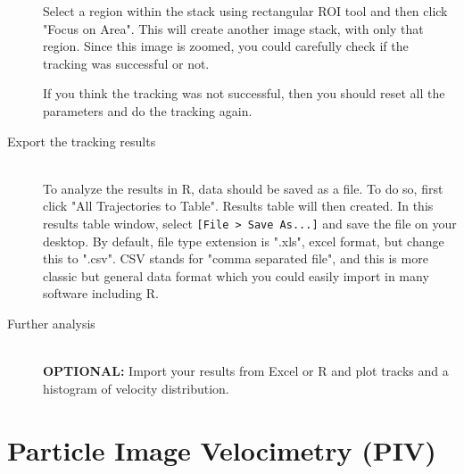 \documentclass[11pnt]{article}
\begin{document}
\begin{description}
Select a region within the stack using rectangular ROI tool and then click "Focus on Area". This will create another image stack, with only that region. Since this image is zoomed, you could carefully check if the tracking was successful or not. 

If you think the tracking was not successful, then you should reset all the parameters and do the tracking again.

\item[Export the tracking results]\hfill\\

To analyze the results in R, data should be saved as a file. To do so, first click "All Trajectories to Table". Results table will then created. In this results table window, select \verb"[File > Save As...]" and save the file on your desktop. By default, file type extension is ".xls", excel format, but change this to ".csv". CSV stands for "comma separated file", and this is more classic but general data format which you could easily import in many software including R.  


\item [Further analysis] \hfill\\

\textbf{OPTIONAL:} Import your results from Excel or R and plot tracks and a histogram of velocity distribution.

\end{description}

\section{Particle Image Velocimetry (PIV)}
\end{document}
